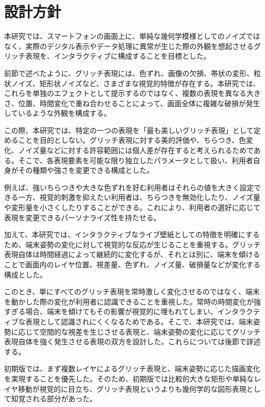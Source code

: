 \section{設計方針}

本研究では、スマートフォンの画面上に、単純な幾何学模様としてのノイズではなく、実際のデジタル表示やデータ処理に異常が生じた際の外観を想起させるグリッチ表現を、インタラクティブに構成することを目標とした。

前節で述べたように、グリッチ表現には、色ずれ、画像の欠損、帯状の変形、粒状ノイズ、矩形状ノイズなど、さまざまな視覚的特徴が存在する。本研究では、これらを単独のエフェクトとして提示するのではなく、複数の表現を異なる大きさ、位置、時間変化で重ね合わせることによって、画面全体に複雑な破損が発生しているような外観を構成する。

この際、本研究では、特定の一つの表現を「最も美しいグリッチ表現」として定めることを目的としない。グリッチ表現に対する美的評価や、ちらつき、色変化、ノイズ量などに対する許容範囲には個人差が存在すると考えられるためである。そこで、各表現要素を可能な限り独立したパラメータとして扱い、利用者自身がその種類や強さを変更できる構成とした。

例えば、強いちらつきや大きな色ずれを好む利用者はそれらの値を大きく設定できる一方、視覚的刺激を抑えたい利用者は、ちらつきを無効化したり、ノイズ量や変形量を小さくしたりすることができる。これにより、利用者の選好に応じて表現を変更できるパーソナライズ性を持たせる。

加えて、本研究では、インタラクティブなライブ壁紙としての特徴を明確にするため、端末姿勢の変化に対して視覚的な反応が生じることを重視する。グリッチ表現自体は時間経過によって継続的に変化するが、それとは別に、端末を傾けることで画面内のレイヤ位置、視差量、色ずれ、ノイズ量、破損量などが変化する構成とした。

このとき、単にすべてのグリッチ表現を常時激しく変化させるのではなく、端末を動かした際の変化が利用者に認識できることを重視した。常時の時間変化が強すぎる場合、端末を傾けてもその影響が視覚的に埋もれてしまい、インタラクティブな表現として認識されにくくなるためである。そこで、本研究では、端末姿勢に応じて空間的な視差を生じさせる表現と、端末姿勢の変化に応じてグリッチ表現自体を強く発生させる表現の双方を設計した。これらについては後節で詳述する。

初期版では、まず複数レイヤによるグリッチ表現と、端末姿勢に応じた描画変化を実現することを優先した。そのため、初期版では比較的大きな矩形や単純なレイヤ移動が視覚的に目立ち、グリッチ表現というよりも幾何学的な図形表現として知覚される部分があった。

